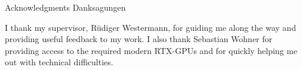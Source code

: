 \makeatletter
{}
{}
{}
\makeatother
\thispagestyle{empty}

\vspace*{20mm}

\begin{center}
\makeatletter
{}
{ Acknowledgments}
{ Danksagungen}
\makeatother
\end{center}

\vspace{10mm}

I thank my supervisor, Rüdiger Westermann, for guiding me along the way and providing useful feedback to my work. I also thank Sebastian Wohner for providing access to the required modern RTX-GPUs and for quickly helping me out with technical difficulties.

\cleardoublepage{}

